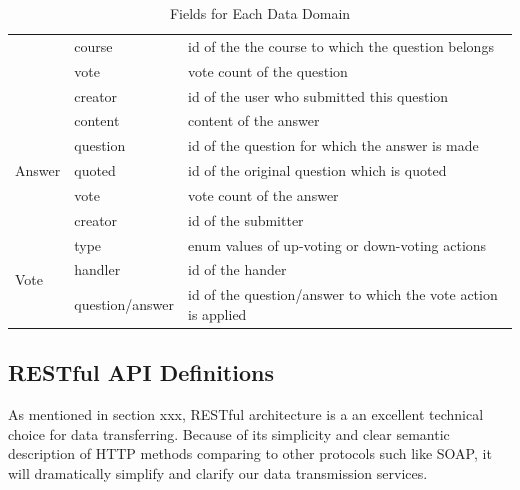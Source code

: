 \begin{table}[]
\begin{tabularx}{\textwidth}{@{}llX@{}}
                          & course          & id of the the course to which the question belongs                                             \\
                          & vote            & vote count of the question                                                                     \\
                          & creator         & id of the user who submitted this question                                                     \\ \midrule
\multirow{5}{*}{Answer}   & content         & content of the answer                                                                          \\
                          & question        & id of the question for which the answer is made                                                \\
                          & quoted          & id of the original question which is quoted                                                    \\
                          & vote            & vote count of the answer                                                                       \\
                          & creator         & id of the submitter                                                                            \\ \midrule
\multirow{3}{*}{Vote}     & type            & enum values of up-voting or down-voting actions                                                \\
                          & handler         & id of the hander                                                                               \\
                          & question/answer & id of the question/answer to which the vote action is applied                                  \\ \midrule
\end{tabularx}
\caption{Fields for Each Data Domain}
\label{table:data-field-table}
\end{table}


\subsection{RESTful API Definitions}

As mentioned in section xxx, RESTful architecture is a an excellent technical choice for data transferring. Because of its simplicity and clear semantic description of HTTP methods comparing to other protocols such like SOAP, it will dramatically simplify and clarify our data transmission services. 

